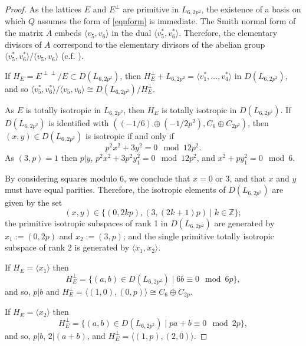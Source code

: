 \documentclass[11pt]{amsart}
\newcommand{\ZZ}{\mathbb{Z}}
\newcommand{\la}{\langle}
\newcommand{\ra}{\rangle}
\newcommand{\op}{\oplus}
\begin{document}
\begin{proof}
As the lattices $E$ and $E^{\perp}$ are primitive in $L_{6,2p^2}$, the existence of a basis on which $Q$ assumes the form of \eqref{eqnform} is immediate. 
The Smith normal form of the matrix $A$ embeds $\la v_5, v_6 \ra$ in the dual $\la v_5^*, v_6^* \ra$.
Therefore, the elementary divisors of $A$ correspond to the elementary divisors of the abelian group $\la v_5^*, v_6^* \ra / \la v_5, v_6 \ra$ (c.f. \cite{GHSK3}). 
  
If $H_E = E^{\perp \perp}/E \subset D(L_{6,2p^2})$, then  $H_E^{\perp} + L_{6,2p^2} = \la v_1^*, \ldots, v_4^* \ra$ in $D(L_{6,2p^2})$, and so  $\la v_5^*, v_6^* \ra / \la v_5, v_6 \ra \cong D(L_{6,2p^2}) / H_E^{\perp}$. 

As $E$ is totally isotropic in $L_{6,2p^2}$, then $H_E$ is totally isotropic in $D(L_{6,2p^2})$. 
If $D(L_{6,2p^2})$ is identified with $((-1/6) \op (-1/2p^2), C_6 \op C_{2p^2})$, then $(x, y) \in D(L_{6,2p^2})$ is isotropic if and only if
\begin{equation*}
p^2x^2 + 3y^2 = 0 \mod{12 p^2}.
\end{equation*}
As $(3,p)=1$ then $p \vert y$, $p^2x^2 + 3p^2y_1^2 = 0 \mod{12p^2}$, and $x^2 + py_1^2 = 0 \mod{6}$.
  
By considering squares modulo 6, we conclude that $x = 0$ or $3$, and that $x$ and $y$ must have equal parities. 
Therefore, the isotropic elements of $D(L_{6,2p^2})$ are given by the set 
\begin{equation*}
  (x, y) \in \{ (0,2kp), (3, (2k+1)p) \mid k \in \ZZ \};
\end{equation*}
the primitive isotropic subspaces of rank 1 in $D(L_{6,2p^2})$ are generated by $x_1 := (0, 2p)$ and $x_2 := (3, p)$;
and the single primitive totally isotropic subspace of rank 2 is generated by $\la x_1, x_2 \ra$. 

If $H_E = \la x_1 \ra$ then 
\begin{equation*}
  H_E^{\perp} = \{ (a,b) \in D(L_{6,2p^2}) \mid 6b \equiv 0 \mod{6p} \},
\end{equation*}
and so, $p \vert b$ and $H_E^{\perp} = \la (1,0), (0,p) \ra \cong C_6 \op C_{2p}$.

If $H_E = \la x_2 \ra$ then 
\begin{equation*}
  H_E^{\perp} = \{ (a,b) \in D(L_{6,2p^2}) \mid pa + b \equiv 0 \mod{2p} \},
\end{equation*}
and so, 
$p \vert b$, 
$2 \vert (a+b)$,
and $H_E^{\perp} = \la (1,p), (2,0) \ra$. 


\end{proof}
\end{document}

